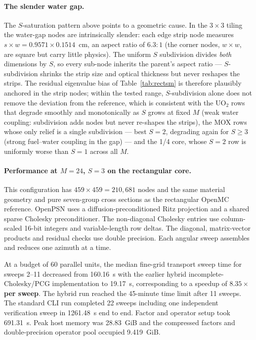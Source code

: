 \documentclass[11pt,a4paper]{article}
\begin{document}
\paragraph{The slender water gap.}
The $S$-saturation pattern above points to a geometric cause. In the
$3\times3$ tiling the water-gap nodes are intrinsically slender: each edge
strip node measures $s \times w = 0.9571\times0.1514$~cm, an aspect
ratio of $6.3{:}1$ (the corner nodes, $w\times w$, are square but carry
little physics). The uniform $S$ subdivision divides \emph{both}
dimensions by $S$, so every sub-node inherits the parent's aspect ratio ---
$S$-subdivision shrinks the strip size and optical thickness but never
reshapes the strips. The residual eigenvalue bias of
Table~\ref{tab:rectsm} is therefore plausibly anchored in the strip
nodes; within the tested range, $S$-subdivision alone does not remove
the deviation from the reference, which is consistent with
the UO$_2$ rows that degrade smoothly and monotonically as $S$ grows at
fixed $M$ (weak water coupling: subdivision adds nodes but never
re-shapes the strips), the MOX rows whose only relief is a single
subdivision --- best $S{=}2$, degrading again for $S{\ge}3$ (strong
fuel--water coupling in the gap) --- and the 1/4 core, whose $S{=}2$ row
is uniformly worse than $S{=}1$ across all $M$.


\paragraph{Performance at $M{=}24$, $S{=}3$ on the rectangular core.}
This configuration has $459\times459=210{,}681$ nodes and the same
material geometry and pure seven-group cross sections as the
rectangular OpenMC reference. OpenPSN uses a diffusion-preconditioned
Ritz projection and a shared sparse Cholesky preconditioner. The
non-diagonal Cholesky entries use column-scaled 16-bit integers and
variable-length row deltas. The diagonal, matrix-vector products and
residual checks use double precision. Each angular sweep assembles and
reduces one azimuth at a time.

At a budget of 60 parallel units, the median fine-grid transport sweep
time for sweeps 2--11 decreased from 160.16~s with the earlier hybrid
incomplete-Cholesky/PCG implementation to 19.17~s, corresponding to a
speedup of \textbf{$8.35\times$ per sweep}. The hybrid run reached the
45-minute time limit after 11 sweeps. The standard CLI run completed 22 sweeps
including one independent verification sweep in 1261.48~s end to end.
Factor and operator setup took 691.31~s.
Peak host memory was 28.83~GiB and the compressed factors and
double-precision operator pool occupied 9.419~GiB.
\end{document}
